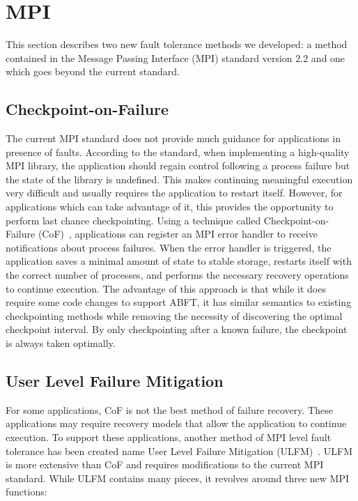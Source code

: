 \section{MPI} \label{sect:mpi}

This section describes two new fault tolerance methods we developed: a method contained in the Message Passing Interface (MPI) standard version 2.2 and one which goes beyond the current standard.

\subsection{Checkpoint-on-Failure} \label{subsect:cof}

The current MPI standard does not provide much guidance for applications in presence of faults. According to the standard, when implementing a high-quality MPI library, the application should regain control following a process failure but the state of the library is undefined. This makes continuing meaningful execution very difficult and usually requires the application to restart itself. However, for applications which can take advantage of it, this provides the opportunity to perform last chance checkpointing. Using a technique called Checkpoint-on-Failure (CoF)~\cite{Bland:EuroPar12}, applications can register an MPI error handler to receive notifications about process failures. When the error handler is triggered, the application saves a minimal amount of state to stable storage, restarts itself with the correct number of processes, and performs the necessary recovery operations to continue execution. The advantage of this approach is that while it does require some code changes to support ABFT, it has similar semantics to existing checkpointing methods while removing the necessity of discovering the optimal checkpoint interval. By only checkpointing after a known failure, the checkpoint is always taken optimally.

\subsection{User Level Failure Mitigation} \label{subsect:ulfm}

For some applications, CoF is not the best method of failure recovery. These applications may require recovery models that allow the application to continue execution. To support these applications, another method of MPI level fault tolerance has been created name User Level Failure Mitigation (ULFM)~\cite{Bland:EuroMPI12}. ULFM is more extensive than CoF and requires modifications to the current MPI standard. While ULFM contains many pieces, it revolves around three new MPI functions:

